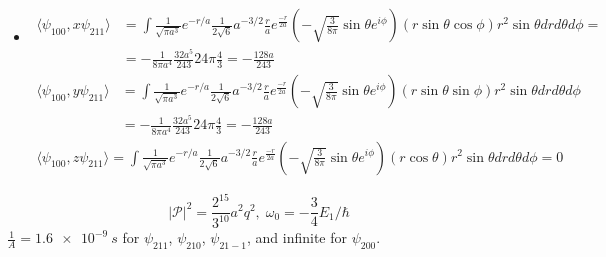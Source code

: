\begin{itemize}
          \begin{align*}
              \langle
              \psi_{100}, z
              \psi_{210}
              \rangle  =
              \int
              \frac{1}{\sqrt{\pi a^3}}e^{-r/a}
              \frac{1}{2\sqrt{6}}a^{-3/2}\frac{r}{a}
              e^{\frac{-r}{2a}}
              \sqrt{\frac{3}{4\pi}}\cos\theta
              (r\cos\theta)
              r^2\sin\theta drd\theta d\phi =
              \frac{128\sqrt{2}}{243}a
          \end{align*}
    \item
          \begin{align*}
              \langle
              \psi_{100}, x
              \psi_{211}
              \rangle & =
              \int
              \frac{1}{\sqrt{\pi a^3}}e^{-r/a}
              \frac{1}{2\sqrt{6}}a^{-3/2}\frac{r}{a}
              e^{\frac{-r}{2a}}
              \left(-
              \sqrt{\frac{3}{8\pi}}\sin\theta e^{i\phi}
              \right)(r\sin\theta\cos\phi)
              r^2\sin\theta drd\theta d\phi = \\
                      & =
              -\frac{1}{8\pi a^4}\frac{32a^5}{243}24\pi \frac{4}{3} =
              -\frac{128a}{243}
          \end{align*}
          \begin{align*}
              \langle
              \psi_{100}, y
              \psi_{211}
              \rangle & =
              \int
              \frac{1}{\sqrt{\pi a^3}}e^{-r/a}
              \frac{1}{2\sqrt{6}}a^{-3/2}\frac{r}{a}
              e^{\frac{-r}{2a}}
              \left(-
              \sqrt{\frac{3}{8\pi}}\sin\theta e^{i\phi}
              \right)(r\sin\theta\sin\phi)
              r^2\sin\theta drd\theta d\phi \\
                      & =
              -\frac{1}{8\pi a^4}\frac{32a^5}{243}24\pi \frac{4}{3} =
              -\frac{128a}{243}
          \end{align*}
          \begin{align*}
              \langle
              \psi_{100}, z
              \psi_{211}
              \rangle  =
              \int
              \frac{1}{\sqrt{\pi a^3}}e^{-r/a}
              \frac{1}{2\sqrt{6}}a^{-3/2}\frac{r}{a}
              e^{\frac{-r}{2a}}
              \left(-
              \sqrt{\frac{3}{8\pi}}\sin\theta e^{i\phi}
              \right)(r\cos\theta)
              r^2\sin\theta drd\theta d\phi = 0
          \end{align*}
\end{itemize}
$$
    |\mathcal P|^2 = \frac{2^{15}}{3^{10}}a^2q^2,\;
    \omega_0 =
    -\frac{3}{4}E_1/\hbar
$$
$\frac{1}{A} = \qty{1.6e-9}{s}$ for $\psi_{211}$,
$\psi_{210}$, $\psi_{21-1}$, and infinite for $\psi_{200}$.